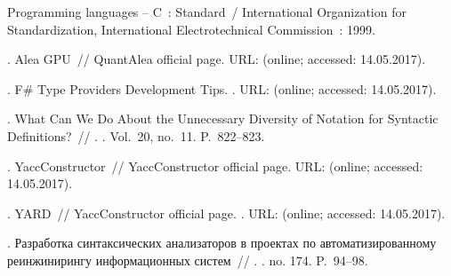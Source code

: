 \begin{thebibliography}{10}
Programming languages – C~: Standard~/ International Organization for
  Standardization, International Electrotechnical Commission~: 1999.

. Alea GPU~// QuantAlea official page. \BibDash
\newblock URL:  (online; accessed:
  14.05.2017).

. F\# Type Providers Development Tips. \BibDash
{}. \BibDash
\newblock URL:
  (online; accessed: 14.05.2017).

. What Can We Do About the Unnecessary Diversity of
  Notation for Syntactic Definitions?~// . \BibDash
{}. \BibDash
\newblock Vol.~20, no.~11. \BibDash
\newblock P.~822--823.

. YaccConstructor~// YaccConstructor official page.
  \BibDash
\newblock URL:  (online; accessed:
  14.05.2017).

. YARD~// YaccConstructor official page. \BibDash
{}. \BibDash
\newblock URL:
   (online;
  accessed: 14.05.2017).

. Разработка синтаксических
  анализаторов в проектах по
  автоматизированному реинжинирингу
  информационных систем~//
  . \BibDash
{}. \BibDash
\newblock no. 174. \BibDash
\newblock P.~94--98.

\end{thebibliography}
